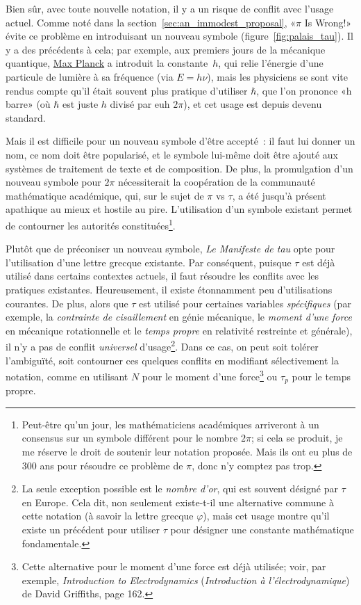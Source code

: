 Bien sûr, avec toute nouvelle notation, il y a un risque de conflit avec
l'usage actuel. Comme noté dans la
section~\ref{sec:an_immodest_proposal}, «\ns $\pi$ Is Wrong!\ns » évite ce problème
en introduisant un nouveau symbole (figure~\ref{fig:palais_tau}). Il y a des
précédents à cela\ns; par exemple, aux premiers jours de la mécanique quantique,
\href{https://fr.wikipedia.org/wiki/Max_Planck}{Max Planck} a introduit la
constante~$h$, qui relie l'énergie d'une particule de lumière à sa fréquence (via
$E = h\nu$), mais les physiciens se sont vite rendus compte qu'il était souvent
plus pratique d'utiliser $\hbar$, que l'on prononce «\ns h barre\ns » (où $\hbar$
est juste $h$ divisé par\textellipsis{} euh\textellipsis{} $2\pi$), et cet usage
est depuis devenu standard.

Mais il est difficile pour un nouveau symbole d'être accepté~: il faut lui
donner un nom, ce nom doit être popularisé, et le symbole lui-même doit être
ajouté aux systèmes de traitement de texte et de composition. De plus, la
promulgation d'un nouveau symbole pour $2\pi$ nécessiterait la coopération de la
communauté mathématique académique, qui, sur le sujet de $\pi$ vs $\tau$, a été
jusqu'à présent apathique au mieux et hostile au pire. L'utilisation d'un
symbole existant permet de contourner les autorités
constituées\ns\footnote{Peut-être qu'un jour, les mathématiciens académiques
arriveront à un consensus sur un symbole différent pour le nombre $2\pi$\ns; si
cela se produit, je me réserve le droit de soutenir leur notation proposée. Mais
ils ont eu plus de 300 ans pour résoudre ce problème de $\pi$, donc n'y comptez
pas trop.}.

Plutôt que de préconiser un nouveau symbole, \emph{Le Manifeste de tau} opte
pour l'utilisation d'une lettre grecque existante. Par conséquent, puisque
$\tau$ est déjà utilisé dans certains contextes actuels, il faut résoudre les
conflits avec les pratiques existantes. Heureusement, il existe étonnamment peu
d'utilisations courantes. De plus, alors que $\tau$ est utilisé pour certaines
variables \emph{spécifiques} (par exemple, la \emph{contrainte de cisaillement}
en génie mécanique, le \emph{moment d'une force} en mécanique rotationnelle et
le \emph{temps propre} en relativité restreinte et générale), il n'y a pas
de conflit \emph{universel} d'usage\ns\footnote{La seule exception
possible est le \emph{nombre d'or}, qui est souvent désigné par $\tau$ en
Europe. Cela dit, non seulement existe-t-il une alternative commune à cette notation
(à savoir la lettre grecque $\varphi$), mais cet usage montre qu'il existe
un précédent pour utiliser $\tau$ pour désigner une constante mathématique
fondamentale.}. Dans ce cas, on peut soit tolérer l'ambiguïté, soit contourner
ces quelques conflits en modifiant sélectivement la notation, comme en
utilisant $N$ pour le moment d'une force\ns\footnote{Cette alternative pour le
moment d'une force est déjà utilisée\ns; voir, par exemple, \emph{Introduction to
Electrodynamics} (\emph{Introduction à l'électrodynamique}) de David Griffiths,
page 162.} ou $\tau_p$ pour le temps propre.


